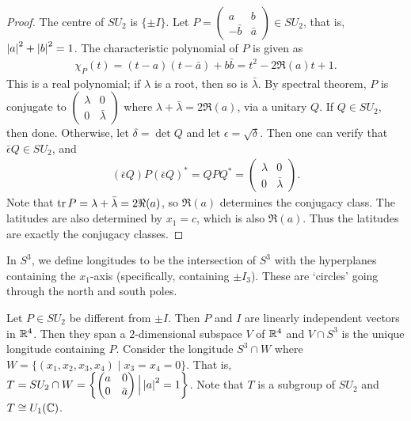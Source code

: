 \begin{proof}
    The centre of $SU_{2}$ is $\{\pm I\}$. Let $P = \begin{pmatrix}
        a & b \\ -\bar{b} & \bar{a}
    \end{pmatrix} \in SU_{2}$, that is, $\left| a \right|^{2} + \left| b \right|^{2} = 1$. The characteristic polynomial of $P$ is given as
    \begin{align}
        \chi_{P}(t) = (t-a)(t-\bar{a}) + b \bar{b} = t^{2} - 2\Re(a) t + 1.
    \end{align}
    This is a real polynomial; if $\lambda$ is a root, then so is $\bar{\lambda}$. By spectral theorem, $P$ is conjugate to $\begin{pmatrix}
        \lambda & 0 \\ 0 & \bar{\lambda}
    \end{pmatrix}$ where $\lambda + \bar{\lambda} = 2\Re(a)$, via a unitary $Q$. If $Q \in SU_{2}$, then done. Otherwise, let $\delta = \det Q$ and let $\epsilon = \sqrt{\delta}$. Then one can verify that $\bar{\epsilon} Q \in SU_{2}$, and \begin{align}
        (\bar{\epsilon} Q) P (\bar{\epsilon} Q)^{\ast} = Q P Q^{\ast} = \begin{pmatrix}
            \lambda & 0 \\ 0 & \bar{\lambda}
        \end{pmatrix}.
    \end{align}
    Note that $\operatorname{tr} P = \lambda + \bar{\lambda} = 2\Re(a)$, so $\Re(a)$ determines the conjugacy class. The latitudes are also determined by $x_{1} = c$, which is also $\Re(a)$. Thus the latitudes are exactly the conjugacy classes.
\end{proof}

\begin{definition}
    In $S^{3}$, we define longitudes to be the intersection of $S^{3}$ with the hyperplanes containing the $x_{1}$-axis (specifically, containing $\pm I_{3}$). These are `circles' going through the north and south poles.
\end{definition}

Let $P \in SU_{2}$ be different from $\pm I$. Then $P$ and $I$ are linearly independent vectors in $\mathbb{R}^{4}$. Then they span a $2$-dimensional subspace $V$ of $\mathbb{R}^{4}$ and $V \cap S^{3}$ is the unique longitude containing $P$. Consider the longitude $S^{3} \cap W$ where $W = \{(x_{1},x_{2},x_{3},x_{4}) \mid x_{3} = x_{4} = 0\}$. That is, $T = SU_{2} \cap W = \left\{ \begin{pmatrix}
    a & 0 \\ 0 & \bar{a}
\end{pmatrix} \Big| \left| a \right|^{2} = 1 \right\}$. Note that $T$ is a subgroup of $SU_{2}$ and $T \cong U_{1}(\mathbb{C})$.

